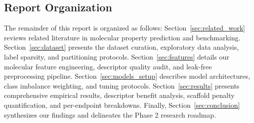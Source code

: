 \subsection{Report Organization}
The remainder of this report is organized as follows: Section~\ref{sec:related_work} reviews related literature in molecular property prediction and benchmarking. Section~\ref{sec:dataset} presents the dataset curation, exploratory data analysis, label sparsity, and partitioning protocols. Section~\ref{sec:features} details our molecular feature engineering, descriptor quality audit, and leak-free preprocessing pipeline. Section~\ref{sec:models_setup} describes model architectures, class imbalance weighting, and tuning protocols. Section~\ref{sec:results} presents comprehensive empirical results, descriptor benefit analysis, scaffold penalty quantification, and per-endpoint breakdowns. Finally, Section~\ref{sec:conclusion} synthesizes our findings and delineates the Phase 2 research roadmap.
